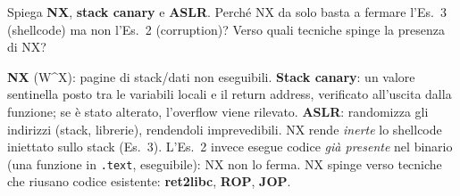 \question[6]
Spiega \textbf{NX}, \textbf{stack canary} e \textbf{ASLR}. Perché NX da solo basta a fermare l'Es.\ 3 (shellcode) ma non l'Es.\ 2 (corruption)? Verso quali tecniche spinge la presenza di NX?
\begin{solution}
\textbf{NX} (W\textasciicircum{}X): pagine di stack/dati non eseguibili. \textbf{Stack canary}: un valore sentinella posto tra le variabili locali e il return address, verificato all'uscita dalla funzione; se è stato alterato, l'overflow viene rilevato. \textbf{ASLR}: randomizza gli indirizzi (stack, librerie), rendendoli imprevedibili.
NX rende \emph{inerte} lo shellcode iniettato sullo stack (Es.\ 3). L'Es.\ 2 invece esegue codice \emph{già presente} nel binario (una funzione in \lstinline|.text|, eseguibile): NX non lo ferma.
NX spinge verso tecniche che riusano codice esistente: \textbf{ret2libc}, \textbf{ROP}, \textbf{JOP}.
\end{solution}
